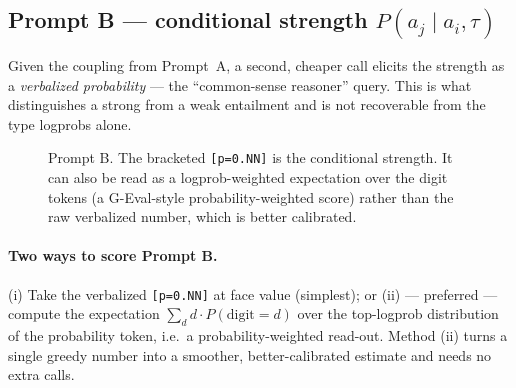 \documentclass[11pt]{article}
\begin{document}
\subsection{Prompt B --- conditional strength $P(a_j\mid a_i,\tau)$}
Given the coupling from Prompt~A, a second, cheaper call elicits the strength as a
\emph{verbalized probability} --- the ``common-sense reasoner'' query. This is what
distinguishes a strong from a weak entailment and is not recoverable from the type logprobs
alone.

\begin{figure}[h]\centering
{}
\caption{Prompt B. The bracketed \texttt{[p=0.NN]} is the conditional strength. It can also
be read as a logprob-weighted expectation over the digit tokens (a G-Eval-style
probability-weighted score) rather than the raw verbalized number, which is better
calibrated.}
\label{fig:promptB}
\end{figure}

\paragraph{Two ways to score Prompt B.} (i) Take the verbalized \texttt{[p=0.NN]} at face
value (simplest); or (ii) --- preferred --- compute the expectation
$\sum_{d} d\cdot P(\text{digit}{=}d)$ over the top-logprob distribution of the probability
token, i.e.\ a probability-weighted read-out. Method (ii) turns a single greedy number into
a smoother, better-calibrated estimate and needs no extra calls.
\end{document}
